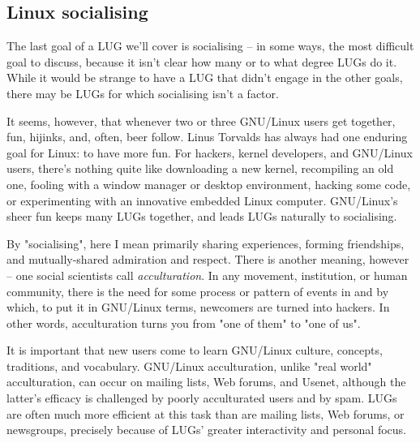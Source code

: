 \subsection{Linux socialising}

The last goal of a LUG we'll cover is socialising -- in some ways,
the most difficult goal to discuss, because it isn't clear how
many or to what degree LUGs do it. While it would be strange to
have a LUG that didn't engage in the other goals, there may be
LUGs for which socialising isn't a factor.

It seems, however, that whenever two or three GNU/Linux users get together,
fun, hijinks, and, often, beer follow. Linus Torvalds has
always had one enduring goal for Linux: to have more fun. For hackers,
kernel developers, and GNU/Linux users, there's nothing quite like
downloading a new kernel, recompiling an old one, fooling with a
window manager or desktop environment, hacking some code, or experimenting
with an innovative embedded Linux computer. GNU/Linux's sheer fun keeps many
LUGs together, and leads LUGs naturally to socialising.

By "socialising", here I mean primarily sharing experiences, forming
friendships, and mutually-shared admiration and respect. There is
another meaning, however -- one social scientists call
{\itshape acculturation\/}. In any movement, institution, or human
community, there is the need for some process or pattern of events in
and by which, to put it in GNU/Linux terms, newcomers are turned into
hackers. In other words, acculturation turns you from "one of them" to
"one of us".

It is important that new users come to learn GNU/Linux culture,
concepts, traditions, and vocabulary.  GNU/Linux acculturation, unlike "real
world" acculturation, can occur on mailing lists, Web forums, and
Usenet, although the latter's efficacy is challenged by poorly
acculturated users and by spam. LUGs are often much more efficient at
this task than are mailing lists, Web forums, or newsgroups, precisely
because of LUGs' greater interactivity and personal focus.



